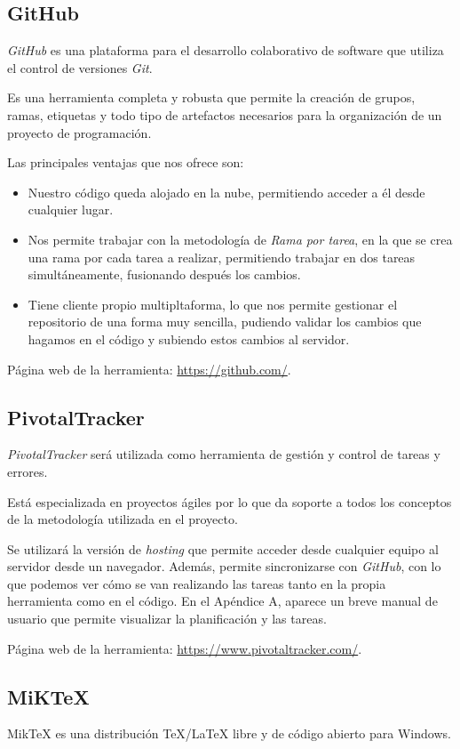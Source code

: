 \subsection{GitHub}
\textit{GitHub} es una plataforma para el desarrollo colaborativo de software que utiliza el control de versiones \textit{Git}.

Es una herramienta completa y robusta que permite la creación de grupos, ramas, etiquetas y todo tipo de artefactos necesarios para la organización de un proyecto de programación.

Las principales ventajas que nos ofrece son:
\begin{itemize}
\item Nuestro código queda alojado en la nube, permitiendo acceder a él desde cualquier lugar.
\item Nos permite trabajar con la metodología de \textit{Rama por tarea}, en la que se crea una rama por cada tarea a realizar, permitiendo trabajar en dos tareas simultáneamente, fusionando después los cambios.
\item Tiene cliente propio multipltaforma, lo que nos permite gestionar el repositorio de una forma muy sencilla, pudiendo validar los cambios que hagamos en el código y subiendo estos cambios al servidor.
\end{itemize}

Página web de la herramienta: \url{https://github.com/}.


\subsection{PivotalTracker}
\textit{PivotalTracker} será utilizada como herramienta de gestión y control de tareas y errores.

Está especializada en proyectos ágiles por lo que da soporte a todos los conceptos de la metodología \scrum{} utilizada en el proyecto.

Se utilizará la versión de \textit{hosting} que permite acceder desde cualquier equipo al servidor desde un navegador. Además, permite sincronizarse con \textit{GitHub}, con lo que podemos ver cómo se van realizando las tareas tanto en la propia herramienta como en el código. En el Apéndice A, aparece un breve manual de usuario que permite visualizar la planificación y las tareas.

Página web de la herramienta: \url{https://www.pivotaltracker.com/}.


\subsection{MiK\TeX{}}
Mik\TeX{} es una distribución \TeX{}/\LaTeX{} libre y de código abierto para Windows.

